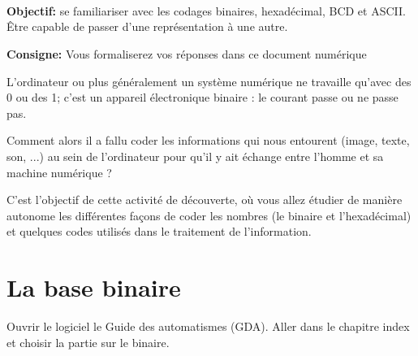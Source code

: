 \documentclass{article}
\begin{document}
\begin{center}
	\begin{flushright}
		\begin{Form}
			\\
			\\
			\\
		\end{Form}
	\end{flushright}

	\vspace{1em}
	\Large
	\textbf{Objectif:} se familiariser avec les codages binaires, hexadécimal, BCD et ASCII. Être capable de passer d'une représentation à une autre.

	\vspace{2em}
	\large
	\textbf{Consigne:} Vous formaliserez vos réponses dans ce document numérique
\end{center}
	\vspace{1em}

	L'ordinateur ou plus généralement un système numérique ne travaille qu'avec des \og{}0\fg{} ou des \og{}1\fg{}; 
	c'est un appareil électronique \og{}binaire\fg{} : le courant passe ou ne passe pas.

	Comment alors il a fallu coder les informations qui nous entourent (image, texte, son, ...) au
	sein de l'ordinateur pour qu'il y ait échange entre l'homme et sa machine numérique ?

	C'est l'objectif de cette activité de découverte, où vous allez étudier de manière autonome les
	différentes façons de coder les nombres (le binaire et l'hexadécimal) et quelques codes utilisés
	dans le traitement de l'information.

\section{La base binaire}
Ouvrir le logiciel \og{}le Guide des automatismes\fg{} (GDA).
Aller dans le chapitre \og{}index\fg{} et choisir la partie sur le binaire.
\end{document}
